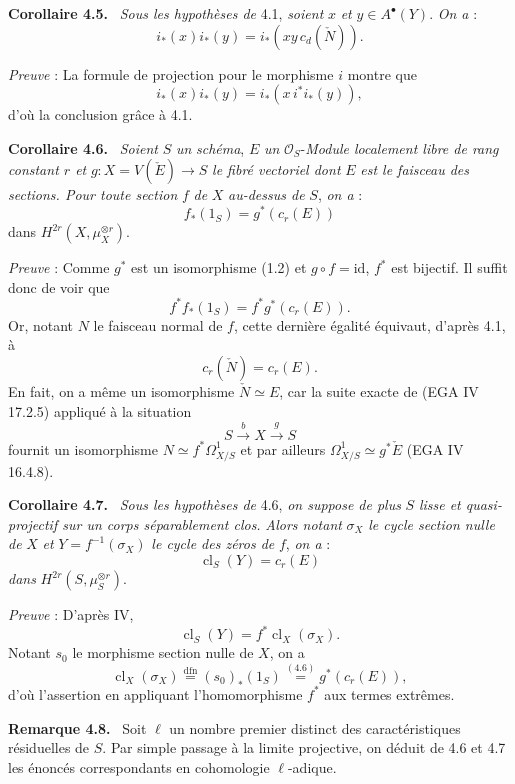 \documentclass[11pt]{article}
\newenvironment{statement}[1]{\par\medskip\noindent\textbf{#1.}\ }{\par\medskip}
\providecommand{\cl}{\operatorname{cl}}
\providecommand{\cl}{\operatorname{cl}}
\providecommand{\cl}{\operatorname{cl}}
\begin{document}
\begin{statement}{Corollaire 4.5}
\emph{Sous les hypothèses de} 4.1, \emph{soient} $x$ \emph{et} $y\in A^\bullet(Y)$. \emph{On a} :
\[
i_*(x)i_*(y)=i_*(xy\,c_d(\check N)).
\]
\end{statement}

\emph{Preuve} : La formule de projection pour le morphisme $i$ montre que
\[
i_*(x)i_*(y)=i_*(x\,i^*i_*(y)),
\]
d'où la conclusion grâce à 4.1.

\begin{statement}{Corollaire 4.6}
\emph{Soient} $S$ \emph{un} \emph{schéma}, $E$ \emph{un} $\mathcal O_S$-\emph{Module localement libre de rang constant $r$ et} $g:X=V(\check E)\to S$ \emph{le fibré vectoriel dont} $E$ \emph{est le faisceau des sections. Pour toute section} $f$ \emph{de} $X$ \emph{au-dessus de} $S$, \emph{on a} :
\[
f_*(1_S)=g^*(c_r(E))
\]
dans $H^{2r}(X,\mu_X^{\otimes r})$.
\end{statement}

\emph{Preuve} : Comme $g^*$ est un isomorphisme (1.2) et $g\circ f=\mathrm{id}$, $f^*$ est bijectif. Il suffit donc de voir que
\[
f^*f_*(1_S)=f^*g^*(c_r(E)).
\]
Or, notant $N$ le faisceau normal de $f$, cette dernière égalité équivaut, d'après 4.1, à
\[
c_r(\check N)=c_r(E).
\]
En fait, on a même un isomorphisme $\check N\simeq E$, car la suite exacte de (EGA IV 17.2.5) appliqué à la situation
\[
S\xrightarrow{b} X\xrightarrow{g} S
\]
fournit un isomorphisme $N\simeq f^*\Omega^1_{X/S}$ et par ailleurs $\Omega^1_{X/S}\simeq g^*\check E$ (EGA IV 16.4.8).

\begin{statement}{Corollaire 4.7}
\emph{Sous les hypothèses de} 4.6, \emph{on suppose de plus} $S$ \emph{lisse et quasi-projectif sur un corps séparablement clos.} \emph{Alors notant} $\sigma_X$ \emph{le cycle section nulle de} $X$ \emph{et} $Y=f^{-1}(\sigma_X)$ \emph{le cycle des zéros de} $f$, \emph{on a} :
\[
\cl_S(Y)=c_r(E)
\]
\emph{dans} $H^{2r}(S,\mu_S^{\otimes r})$.
\end{statement}

\emph{Preuve} : D'après IV,
\[
\cl_S(Y)=f^*\cl_X(\sigma_X).
\]
Notant $s_0$ le morphisme section nulle de $X$, on a
\[
\cl_X(\sigma_X)\stackrel{\mathrm{dfn}}{=}(s_0)_*(1_S)\stackrel{(4.6)}{=}g^*(c_r(E)),
\]
d'où l'assertion en appliquant l'homomorphisme $f^*$ aux termes extrêmes.

\begin{statement}{Remarque 4.8}
Soit $\ell$ un nombre premier distinct des caractéristiques résiduelles de $S$. Par simple passage à la limite projective, on déduit de 4.6 et 4.7 les énoncés correspondants en cohomologie $\ell$-adique.
\end{statement}
\end{document}

